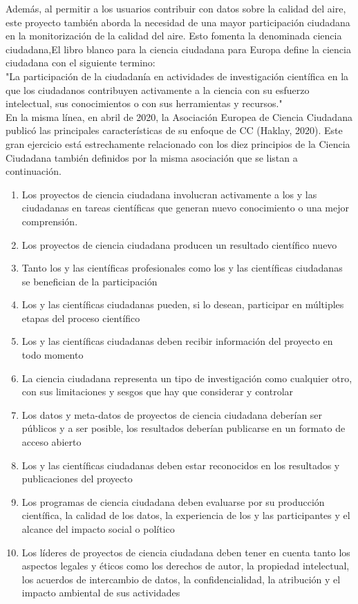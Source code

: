 Además, al permitir a los usuarios contribuir con datos sobre la calidad del aire, este proyecto también aborda la necesidad de una mayor participación ciudadana en la monitorización de la calidad del aire.
Esto fomenta la denominada ciencia ciudadana,El libro blanco para la ciencia ciudadana para Europa define la ciencia ciudadana con el siguiente termino:\\
"La participación de la ciudadanía en actividades de investigación científica en la que los ciudadanos contribuyen activamente a la ciencia con su esfuerzo intelectual, sus conocimientos o con sus herramientas y recursos."\\
En la misma línea, en abril de 2020, la Asociación Europea de Ciencia Ciudadana publicó las principales características de su enfoque de CC (Haklay, 2020). Este gran ejercicio está estrechamente relacionado con los diez principios de la Ciencia Ciudadana también definidos por la misma asociación que se listan a continuación.
\begin{enumerate}
    \item Los proyectos de ciencia ciudadana involucran activamente a los y las ciudadanas en tareas
científicas que generan nuevo conocimiento o una mejor comprensión.
    \item Los proyectos de ciencia ciudadana producen un resultado científico nuevo
    \item Tanto los y las científicas profesionales como los y las científicas ciudadanas se benefician de
la participación
    \item Los y las científicas ciudadanas pueden, si lo desean, participar en múltiples etapas del proceso
 científico 
    \item Los y las científicas ciudadanas deben recibir información del proyecto en todo momento
    \item La ciencia ciudadana representa un tipo de investigación como cualquier otro, con sus
limitaciones y sesgos que hay que considerar y controlar
    \item Los datos y meta-datos de proyectos de ciencia ciudadana deberían ser públicos y a ser posible,
los resultados deberían publicarse en un formato de acceso abierto
    \item Los y las científicas ciudadanas deben estar reconocidos en los resultados y publicaciones del
proyecto
    \item Los programas de ciencia ciudadana deben evaluarse por su producción científica, la calidad de
los datos, la experiencia de los y las participantes y el alcance del impacto social o político
    \item Los líderes de proyectos de ciencia ciudadana deben tener en cuenta tanto los aspectos legales
y éticos como los derechos de autor, la propiedad intelectual, los acuerdos de intercambio de
datos, la confidencialidad, la atribución y el impacto ambiental de sus actividades
    
\end{enumerate}
